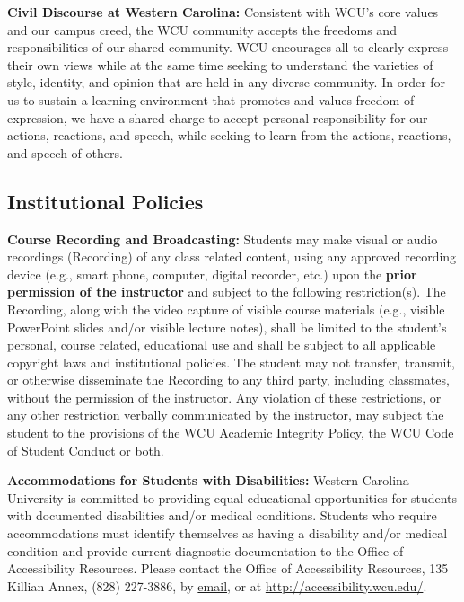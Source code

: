 \documentclass[]{tufte-book}
\begin{document}
\textbf{Civil Discourse at Western Carolina:} Consistent with WCU's core values and our campus creed, the WCU community accepts the freedoms and responsibilities of our shared community. WCU encourages all to clearly express their own views while at the same time seeking to understand the varieties of style, identity, and opinion that are held in any diverse community. In order for us to sustain a learning environment that promotes and values freedom of expression, we have a shared charge to accept personal responsibility for our actions, reactions, and speech, while seeking to learn from the actions, reactions, and speech of others.

\hypertarget{institutional-policies}{%
\subsection*{Institutional Policies}\label{institutional-policies}}

\textbf{Course Recording and Broadcasting:} Students may make visual or audio recordings (Recording) of any class related content, using any approved recording device (e.g., smart phone, computer, digital recorder, etc.) upon the \textbf{prior permission of the instructor} and subject to the following restriction(s). The Recording, along with the video capture of visible course materials (e.g., visible PowerPoint slides and/or visible lecture notes), shall be limited to the student's personal, course related, educational use and shall be subject to all applicable copyright laws and institutional policies. The student may not transfer, transmit, or otherwise disseminate the Recording to any third party, including classmates, without the permission of the instructor. Any violation of these restrictions, or any other restriction verbally communicated by the instructor, may subject the student to the provisions of the WCU Academic Integrity Policy, the WCU Code of Student Conduct or both.

\textbf{Accommodations for Students with Disabilities:} Western Carolina University is committed to providing equal educational opportunities for students with documented disabilities and/or medical conditions. Students who require accommodations must identify themselves as having a disability and/or medical condition and provide current diagnostic documentation to the Office of Accessibility Resources. Please contact the Office of Accessibility Resources, 135 Killian Annex, (828) 227-3886, by \href{mailto:accessibility@wcu.edu}{email}, or at \href{https://www.wcu.edu/learn/academic-services/disability-services/index.aspx}{http://accessibility.wcu.edu/}.
\end{document}
